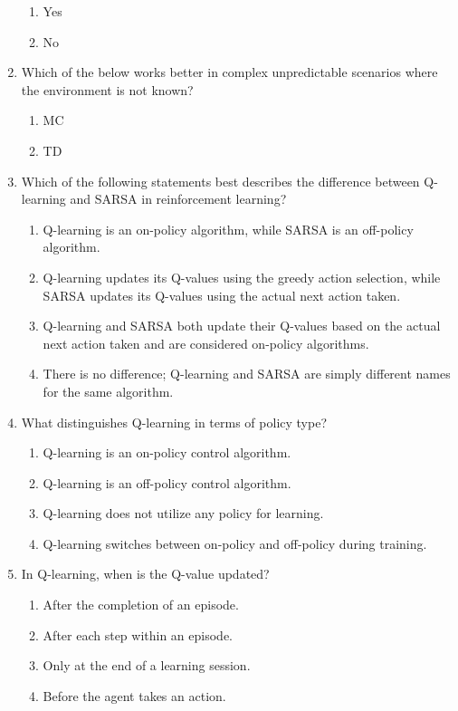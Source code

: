 \documentclass{report}
\numberwithin{equation}{section}
\begin{document}
\begin{enumerate}
    \begin{enumerate}[label=\alph*.]
        \item Yes
        \item No
    \end{enumerate}
    \item Which of the below works better in complex unpredictable scenarios where the environment is not known?
    \begin{enumerate}[label=\alph*.]
        \item MC
        \item TD
    \end{enumerate}
\item Which of the following statements best describes the difference between Q-learning and SARSA in reinforcement learning?
\begin{enumerate}[label=\alph*.]
    \item Q-learning is an on-policy algorithm, while SARSA is an off-policy algorithm.
    \item Q-learning updates its Q-values using the greedy action selection, while SARSA updates its Q-values using the actual next action taken.
    \item Q-learning and SARSA both update their Q-values based on the actual next action taken and are considered on-policy algorithms.
    \item There is no difference; Q-learning and SARSA are simply different names for the same algorithm.
\end{enumerate}

\item What distinguishes Q-learning in terms of policy type?
\begin{enumerate}[label=\alph*.]
    \item Q-learning is an on-policy control algorithm.
    \item Q-learning is an off-policy control algorithm.
    \item Q-learning does not utilize any policy for learning.
    \item Q-learning switches between on-policy and off-policy during training.
\end{enumerate}

\item In Q-learning, when is the Q-value updated?
\begin{enumerate}[label=\alph*.]
    \item After the completion of an episode.
    \item After each step within an episode.
    \item Only at the end of a learning session.
    \item Before the agent takes an action.
\end{enumerate}


\end{enumerate}
\end{document}
